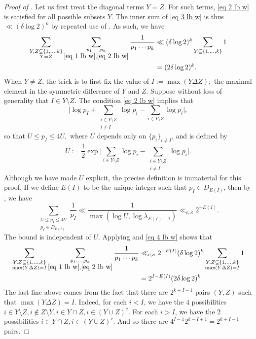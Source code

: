 \documentclass{amsart}
\theoremstyle{definition}
\numberwithin{equation}{section}
\newcommand{\density}{\delta}
\begin{document}
\begin{proof}[Proof of ]
	Let us first treat the diagonal terms $Y = Z$. For such terms, \eqref{eq 2 lb w} is satisfied for all possible subsets $Y$. The inner sum of \eqref{eq 3 lb w} is thus $\ll  (\density \log 2)^k$ by repeated use of . As such, we have
	\begin{align} \label{eq 3.5 lb w}
		\sum_{\substack{Y,Z \subseteq \{1,\dots,k\} \\ Y = Z}}  \sum_{\substack{p_1,\dots,p_k\\ \eqref{eq 1 lb w}, \eqref{eq 2 lb w}}} \frac{1}{p_1\cdots p_k} & \ll (\density \log 2)^k\sum_{Y \subseteq \{1,\dots,k\}} 1 \\
		&= (2\density \log 2)^k. \nonumber
	\end{align}
	When $Y \ne Z$, the trick is to first fix the value of $I := \max (Y \Delta Z);$ the maximal element in the symmetric difference of $Y$ and $Z$. Suppose without loss of generality that $I \in Y \setminus Z$. The condition \eqref{eq 2 lb w} implies that
	$$\Big|\log p_I + \sum_{\substack{i \in Y \setminus Z \\ i \ne I}} \log p_i - \sum_{i \in Y \setminus Z} \log p_i \Big|,$$
	so that $U \leq p_I \leq 4U,$ where $U$ depends only on $\{p_i\}_{i \ne I}$, and is defined by
	$$U := \frac{1}{2}\exp\Big[\sum_{i \in Y \setminus Z} \log p_i - \sum_{\substack{i \in Y \setminus Z \\ i \ne I}} \log p_i\Big].$$
	Although we have made $U$ explicit, the precise definition is immaterial for this proof. If we define $E(I)$ to be the unique integer such that $p_I \in D_{E(I)}$, then by , we have
	\begin{equation}\label{eq 4 lb w}
		\sum_{\substack{U \leq p_I \leq 4U \\ p_I \in D_{E(I)}}} \frac{1}{p_I} \ll \frac{1}{\max(\log U, \log \lambda_{E(I)-1})} \ll_{c,\kappa} 2^{-E(I)}.
	\end{equation}
	The bound is independent of $U$. Applying  and \eqref{eq 4 lb w} shows that
	\begin{align} \label{eq 5 lb w}
		\sum_{\substack{Y,Z \subseteq \{1,\dots,k\} \\ \max(Y \Delta Z) = I}}  \sum_{\substack{p_1,\dots,p_k\\ \eqref{eq 1 lb w}, \eqref{eq 2 lb w}}} \frac{1}{p_1\cdots p_k} &\ll_{c,\kappa} 2^{-E(I)} (\density \log 2)^k \sum_{\substack{Y,Z \subseteq \{1,\dots,k\} \\ \max(Y \Delta Z) = I}} 1\\ &= 2^{I-E(I)} (2\density \log 2)^k \nonumber
	\end{align}
	The last line above comes from the fact that there are $2^{k+I-1}$ pairs $(Y,Z)$ such that $\max(Y \Delta Z) = I$. Indeed, for each $i < I$, we have the $4$ possibilities $i \in Y \setminus Z, i \not \in Z \setminus Y, i \in Y \cap Z, i \in (Y \cup Z)^c$. For each $i > I$, we have the $2$ possibilities $i \in Y \cap Z, i \in (Y \cup Z)^c$. And so there are $4^{I-1}2^{k-I+1} = 2^{k+I-1}$ pairs.
	

\end{proof}
\end{document}
